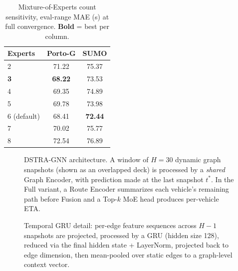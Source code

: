 \begin{table}[t]
    \centering
    \caption{Mixture-of-Experts count sensitivity, eval-range MAE (s) at full convergence. \textbf{Bold} = best per column.}\label{tab:moe-expert-sweep}
    \begin{tabular}{@{}lcc@{}}
        \toprule
        \textbf{Experts} & Porto-G & SUMO \\
        \midrule
        2           & 71.22          & 75.37          \\
        \textbf{3}  & \textbf{68.22} & 73.53          \\
        4           & 69.35          & 74.89          \\
        5           & 69.78          & 73.98          \\
        6 (default) & 68.41          & \textbf{72.44} \\
        7           & 70.02          & 75.77          \\
        8           & 72.54          & 76.89          \\
        \bottomrule
    \end{tabular}
\end{table}

\begin{figure}[t]
    \centering
    \resizebox{0.88\textwidth}{!}{}
    \caption{DSTRA-GNN architecture. A window of $H{=}30$ dynamic graph snapshots (shown as an overlapped deck) is processed by a \emph{shared} Graph Encoder, with prediction made at the last snapshot $t^*$. In the Full variant, a Route Encoder summarizes each vehicle's remaining path before Fusion and a Top-$k$ MoE head produces per-vehicle ETA.}\label{fig:temporal-moe-eta}
\end{figure}

\begin{figure}[t]
    \centering
    \resizebox{\linewidth}{!}{}
    \caption{Temporal GRU detail: per-edge feature sequences across $H{-}1$ snapshots are projected, processed by a GRU (hidden size 128), reduced via the final hidden state + LayerNorm, projected back to edge dimension, then mean-pooled over static edges to a graph-level context vector.}\label{fig:gru-detail}
\end{figure}

